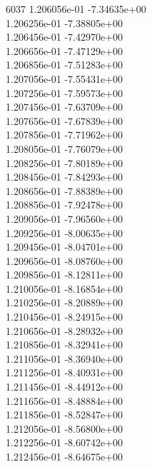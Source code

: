 6037	1.206056e-01	-7.34635e+00	\\ 	1.206256e-01	-7.38805e+00	\\ 	1.206456e-01	-7.42970e+00	\\ 	1.206656e-01	-7.47129e+00	\\ 	1.206856e-01	-7.51283e+00	\\ 	1.207056e-01	-7.55431e+00	\\ 	1.207256e-01	-7.59573e+00	\\ 	1.207456e-01	-7.63709e+00	\\ 	1.207656e-01	-7.67839e+00	\\ 	1.207856e-01	-7.71962e+00	\\ 	1.208056e-01	-7.76079e+00	\\ 	1.208256e-01	-7.80189e+00	\\ 	1.208456e-01	-7.84293e+00	\\ 	1.208656e-01	-7.88389e+00	\\ 	1.208856e-01	-7.92478e+00	\\ 	1.209056e-01	-7.96560e+00	\\ 	1.209256e-01	-8.00635e+00	\\ 	1.209456e-01	-8.04701e+00	\\ 	1.209656e-01	-8.08760e+00	\\ 	1.209856e-01	-8.12811e+00	\\ 	1.210056e-01	-8.16854e+00	\\ 	1.210256e-01	-8.20889e+00	\\ 	1.210456e-01	-8.24915e+00	\\ 	1.210656e-01	-8.28932e+00	\\ 	1.210856e-01	-8.32941e+00	\\ 	1.211056e-01	-8.36940e+00	\\ 	1.211256e-01	-8.40931e+00	\\ 	1.211456e-01	-8.44912e+00	\\ 	1.211656e-01	-8.48884e+00	\\ 	1.211856e-01	-8.52847e+00	\\ 	1.212056e-01	-8.56800e+00	\\ 	1.212256e-01	-8.60742e+00	\\ 	1.212456e-01	-8.64675e+00	\\ \hline
